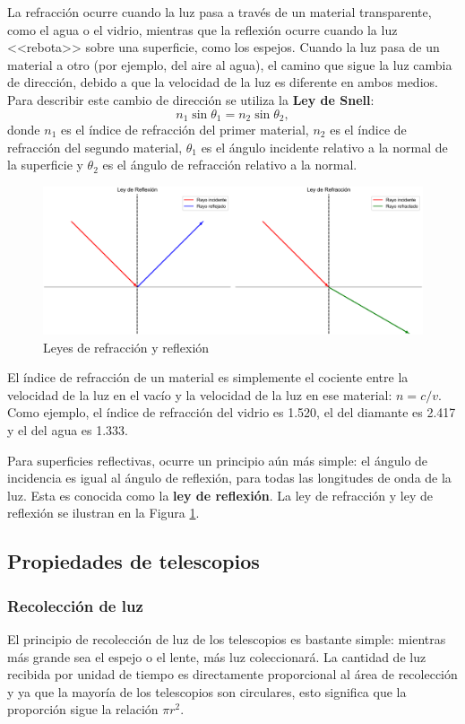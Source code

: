 La refracción ocurre cuando la luz pasa a través de un material transparente, como el agua o el vidrio, mientras que la reflexión ocurre cuando la luz <<rebota>> sobre una superficie, como los espejos. Cuando la luz pasa de un material a otro (por ejemplo, del aire al agua), el camino que sigue la luz cambia de dirección, debido a que la velocidad de la luz es diferente en ambos medios. Para describir este cambio de dirección se utiliza la \textbf{Ley de Snell}:
\[ n_1 \sin\theta_1 = n_2 \sin \theta_2, \]
donde $ n_1 $ es el índice de refracción del primer material, $ n_2 $ es el índice de refracción del segundo material, $ \theta_1 $ es el ángulo incidente relativo a la normal de la superficie y $ \theta_2 $ es el ángulo de refracción relativo a la normal.

\begin{figure}[htb]
  \centering
  \includegraphics[width=\textwidth]{figures/light_laws.png}
  \caption{Leyes de refracción y reflexión}
  \label{fig:light_laws}
  \end{figure} 

El índice de refracción de un material es simplemente el cociente entre la velocidad de la luz en el vacío y la velocidad de la luz en ese material: $ n = c/v $. Como ejemplo, el índice de refracción del vidrio es 1.520, el del diamante es 2.417 y el del agua es 1.333.

Para superficies reflectivas, ocurre un principio aún más simple: el ángulo de incidencia es igual al ángulo de reflexión, para todas las longitudes de onda de la luz. Esta es conocida como la \textbf{ley de reflexión}. La ley de refracción y ley de reflexión se ilustran en la Figura \ref{fig:light_laws}.

\subsection{Propiedades de telescopios}
\subsubsection{Recolección de luz}
El principio de recolección de luz de los telescopios es bastante simple: mientras más grande sea el espejo o el lente, más luz coleccionará. La cantidad de luz recibida por unidad de tiempo es directamente proporcional al área de recolección y ya que la mayoría de los telescopios son circulares, esto significa que la proporción sigue la relación $ \pi r^2 $. 

